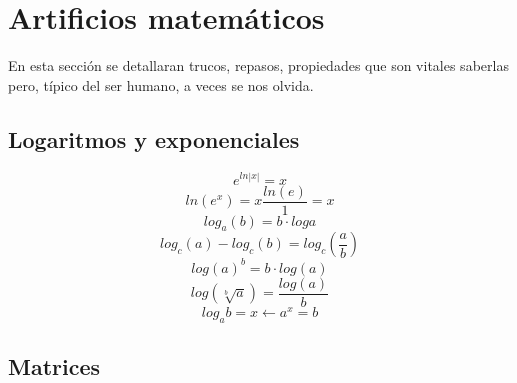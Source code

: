 \documentclass[
	11pt, %
	fleqn, %
	a4paper, %
]{LegrandOrangeBook}
\begin{document}
\chapter{Artificios matemáticos}
En esta sección se detallaran trucos, repasos, propiedades que son vitales saberlas pero, típico del ser humano, a veces se nos olvida.
\section{Logaritmos y exponenciales}
\begin{equation}\label{art:expaln}
e^{ln|x|}=x
\end{equation}
\begin{equation}\label{art:lnaexp}
ln(e^x)=x\frac{ln(e)}{1}=x
\end{equation}
\begin{equation}\label{art:logaritmos}
log_a(b)=b\cdot log a
\end{equation}
\begin{equation}\label{art:logdiv}
log_c(a)-log_c(b)=log_c\left(\frac{a}{b}\right)
\end{equation}
\begin{equation}\label{art:logexp}
log(a)^b=b\cdot log(a)
\end{equation}
\begin{equation}\label{art:raizlog}
log\left(\sqrt[b]{a}\right)=\frac{log(a)}{b}
\end{equation}
\begin{equation}\label{art:log y expo}
log_ab=x\leftarrow a^x=b
\end{equation}
\section{Matrices}
\end{document}
